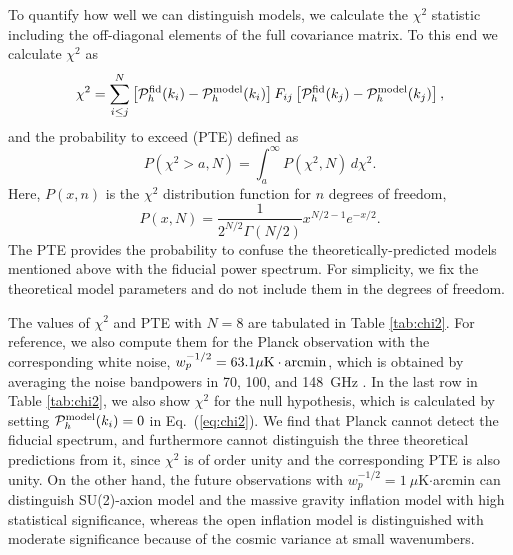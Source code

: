 \documentclass[tightenlines,floats,aps,nofootinbib,prd,onecolumn,preprintnumbers]{revtex4}
\newcommand{\PP}{\mathcal{P}}
\begin{document}
To quantify how well we can distinguish models, we calculate the
$\chi^2$ statistic including the off-diagonal elements of the full
covariance matrix. To this end we calculate $\chi^2$ as
%
\begin{equation}
\chi^2 = 
\sum_{i\leq j}^N
\left[\PP_h^{\rm fid}(k_i) - \PP_h^{\rm model}(k_i)\right]
F_{ij}
\left[\PP_h^{\rm fid}(k_j) - \PP_h^{\rm model}(k_j)\right],
\label{eq:chi2}
\end{equation}
%
and the probability to exceed (PTE) defined as
%
\begin{equation}
 P(\chi^2>a,N) = \int_a^\infty\! P(\chi^2,N)\,d\chi^2.
\end{equation}
%
Here, $P(x,n)$ is the $\chi^2$ distribution function for $n$ degrees of freedom,
%
\begin{equation}
 P(x,N) = \frac{1}{2^{N/2}\Gamma(N/2)}x^{N/2-1}e^{-x/2}.
\end{equation}
%
The PTE provides the probability to confuse the theoretically-predicted models
mentioned above with the fiducial power spectrum. For simplicity, we fix the
theoretical model parameters and do not include them in the degrees of
freedom. 

The values of $\chi^2$ and PTE with $N=8$ are 
tabulated in Table \ref{tab:chi2}. For reference, we also compute them for
the Planck observation with the corresponding white noise, 
$w_p^{-1/2}=63.1 \mu {\rm K}\cdot {\rm arcmin}$, which is obtained by averaging
the noise bandpowers in 70, 100, and 148~GHz \cite{Planck:2006aa}.
In the last row in Table \ref{tab:chi2}, we also show $\chi^2$ for
the null hypothesis, which is calculated by setting $\PP_h^{\rm model}(k_i)=0$ in Eq.~(\ref{eq:chi2}).
We find that Planck cannot detect the fiducial spectrum, and furthermore cannot distinguish the three theoretical predictions
from it, since  $\chi^2$ is of order unity and the
corresponding PTE is also unity. On the other hand, 
the future observations with $w_p^{-1/2}=1~\mu$K$\cdot$arcmin can
distinguish SU(2)-axion model and the massive gravity inflation
model with high statistical significance, whereas the open
inflation model is distinguished with moderate significance
because of the cosmic variance at small wavenumbers.
\end{document}
